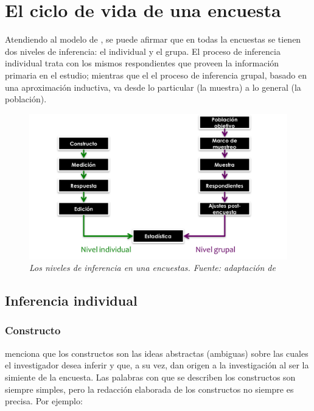 \documentclass[
  12pt,
  spanish,
]{book}
\begin{document}
\hypertarget{el-ciclo-de-vida-de-una-encuesta}{%
\section{El ciclo de vida de una encuesta}\label{el-ciclo-de-vida-de-una-encuesta}}

Atendiendo al modelo de \citet{Groves_Fowler_Couper_Lepkowski_Singer_Tourangeau_2009}, se puede afirmar que en todas la encuestas se tienen dos niveles de inferencia: el individual y el grupa. El proceso de inferencia individual trata con los mismos respondientes que proveen la información primaria en el estudio; mientras que el el proceso de inferencia grupal, basado en una aproximación inductiva, va desde lo particular (la muestra) a lo general (la población).

\begin{figure}
\centering
\includegraphics{Pics/Picture6.png}
\caption{\emph{Los niveles de inferencia en una encuestas. Fuente: adaptación de \citet{Groves_Fowler_Couper_Lepkowski_Singer_Tourangeau_2009}}}
\end{figure}

\hypertarget{inferencia-individual}{%
\subsection{Inferencia individual}\label{inferencia-individual}}

\hypertarget{constructo}{%
\subsubsection*{Constructo}\label{constructo}}

\citet{Gutierrez_2016} menciona que los constructos son las ideas abstractas (ambiguas) sobre las cuales el investigador desea inferir y que, a su vez, dan origen a la investigación al ser la simiente de la encuesta. Las palabras con que se describen los constructos son siempre simples, pero la redacción elaborada de los constructos no siempre es precisa. Por ejemplo:
\end{document}
